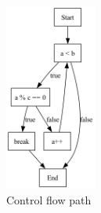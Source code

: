 \documentclass[a4paper,11pt]{report}
\begin{document}
\begin{figure}[htbp]
    \centering
    \includegraphics[width=3cm]{notebook/assets/aufgabe_05_graph.png}
    \caption{Control flow path}
    \label{fig:program_graph}
\end{figure}

\newpage
\end{document}
